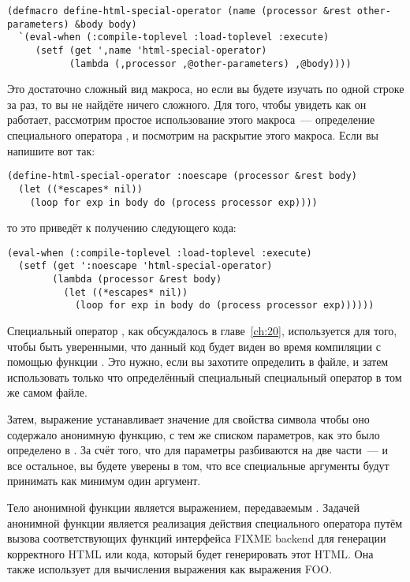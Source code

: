 \begin{lstlisting}
(defmacro define-html-special-operator (name (processor &rest other-parameters) &body body)
  `(eval-when (:compile-toplevel :load-toplevel :execute)
     (setf (get ',name 'html-special-operator)
           (lambda (,processor ,@other-parameters) ,@body))))
\end{lstlisting}

Это достаточно сложный вид макроса, но если вы будете изучать по одной строке за раз, то
вы не найдёте ничего сложного.  Для того, чтобы увидеть как он работает, рассмотрим
простое использование этого макроса~--- определение специального оператора
, и посмотрим на раскрытие этого макроса.  Если вы напишите вот так:

\begin{lstlisting}
(define-html-special-operator :noescape (processor &rest body)
  (let ((*escapes* nil))
    (loop for exp in body do (process processor exp))))
\end{lstlisting}

то это приведёт к получению следующего кода:

\begin{lstlisting}
(eval-when (:compile-toplevel :load-toplevel :execute)
  (setf (get ':noescape 'html-special-operator)
        (lambda (processor &rest body)
          (let ((*escapes* nil))
            (loop for exp in body do (process processor exp))))))
\end{lstlisting}

Специальный оператор , как обсуждалось в главе~\ref{ch:20}, используется
для того, чтобы быть уверенными, что данный код будет виден во время компиляции с помощью
функции .  Это нужно, если вы захотите определить
 в файле, и затем использовать только что определённый
специальный специальный оператор в том же самом файле.

Затем, выражение  устанавливает значение для свойства
 символа  чтобы оно содержало анонимную
функцию, с тем же списком параметров, как это было определено в
.  За счёт того, что для
 параметры разбиваются на две части~--- 
и все остальное, вы будете уверены в том, что все специальные аргументы будут принимать
как минимум один аргумент.

Тело анонимной функции является выражением, передаваемым
.  Задачей анонимной функции является реализация
действия специального оператора путём вызова соответствующих функций интерфейса FIXME
backend для генерации корректного HTML или кода, который будет генерировать этот HTML.
Она также использует  для вычисления выражения как выражения FOO.

